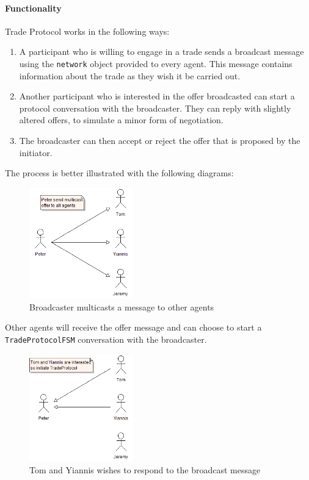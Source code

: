 \paragraph{Functionality}

Trade Protocol works in the following ways:

\begin{enumerate}
	\item A participant who is willing to engage in a trade sends a broadcast message using the \texttt{network} object provided to every agent. This message contains information about the trade as they wish it be carried out.
	\item Another participant who is interested in the offer broadcasted can start a protocol conversation with the broadcaster. They can reply with slightly altered offers, to simulate a minor form of negotiation.
	\item The broadcaster can then accept or reject the offer that is proposed by the initiator.
\end{enumerate}

The process is better illustrated with the following diagrams:

\begin{figure}[h!]
	\centering
	\includegraphics[width=0.4\textwidth]{img/protocol1.png}
	\caption{Broadcaster multicasts a message to other agents}
	\label{fig:protocol1}
\end{figure}

Other agents will receive the offer message and can choose to start a \texttt{TradeProtocolFSM} conversation with the broadcaster.

\begin{figure}[h!]
	\centering
	\includegraphics[width=0.4\textwidth]{img/protocol2.png}
	\caption{Tom and Yiannis wishes to respond to the broadcast message}
	\label{fig:protocol2}
\end{figure}

